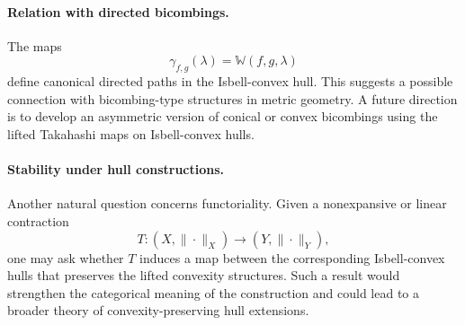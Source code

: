 \documentclass[preprint,12pt]{elsarticle}
\numberwithin{equation}{section}
\begin{document}
\paragraph{Relation with directed bicombings.}
The maps
\[
\gamma_{f,g}(\lambda)=\mathbb W(f,g,\lambda)
\]
define canonical directed paths in the Isbell-convex hull.  This suggests a
possible connection with bicombing-type structures in metric geometry.  A
future direction is to develop an asymmetric version of conical or convex
bicombings using the lifted Takahashi maps on Isbell-convex hulls.

\paragraph{Stability under hull constructions.}
Another natural question concerns functoriality.  Given a nonexpansive or
linear contraction
\[
T:(X,\|\cdot\|_X)\longrightarrow (Y,\|\cdot\|_Y),
\]
one may ask whether \(T\) induces a map between the corresponding
Isbell-convex hulls that preserves the lifted convexity structures.  Such a
result would strengthen the categorical meaning of the construction and could
lead to a broader theory of convexity-preserving hull extensions.
\end{document}
